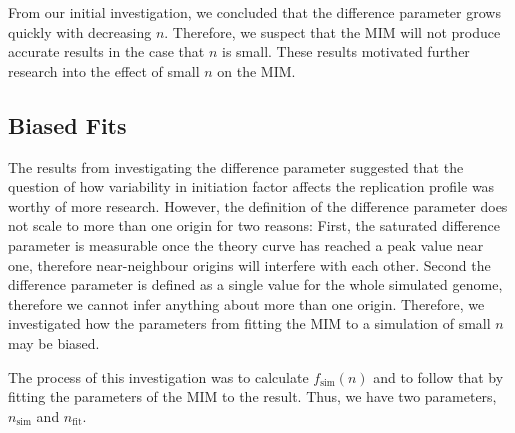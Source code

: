 		From our initial investigation, we concluded that the difference parameter grows quickly with decreasing $n$.
		Therefore, we suspect that the MIM will not produce accurate results in the case that $n$ is small.
		These results motivated further research into the effect of small $n$ on the MIM.
		
		
		\subsection{Biased Fits}
		\label{subsec:BiasedFits}
		
		The results from investigating the difference parameter suggested that the question of how variability in initiation factor affects the replication profile was worthy of more research.
		However, the definition of the difference parameter does not scale to more than one origin for two reasons:
		First, the saturated difference parameter is measurable once the theory curve has reached a peak value near one, therefore near-neighbour origins will interfere with each other.
		Second the difference parameter is defined as a single value for the whole simulated genome, therefore we cannot infer anything about more than one origin.
		Therefore, we investigated how the parameters from fitting the MIM to a simulation of small $n$ may be biased.
		
		The process of this investigation was to calculate $f_\text{sim}(n)$ and to follow that by fitting the parameters of the MIM to the result.
		Thus, we have two parameters, $n_\text{sim}$ and $n_\text{fit}$.